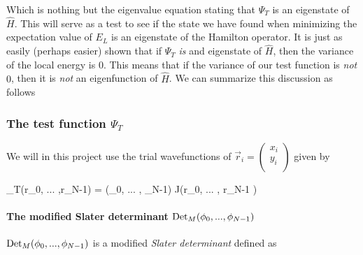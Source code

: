 Which is nothing but the eigenvalue equation stating that $\Psi_T$ is an eigenstate of $\hat{H}$.
This will serve as a test to see if the state we have found when minimizing the expectation value of $E_L$ is an eigenstate of the Hamilton operator. 
It is just as easily (perhaps easier) shown that if $\Psi_T$ \textit{is} and eigenstate of $\hat{H}$, then the variance of the local energy is $0$. 
This means that if the variance of our test function is \textit{not} $0$, then it is \textit{not} an eigenfunction of $\hat{H}$. 
We can summarize this discussion as follows

\eqs
{}
\eqf











\subsubsection{The test function $\Psi_T$}

We will in this project use the trial wavefunctions of $\vec r_i = \left ( \begin{matrix} x_i \\ y_i \\ \end{matrix}\right )$ given by 

\eqs
\Psi_T(\vec r_0, ... ,\vec r_{N-1})  = \Det(\phi_0,  ... , \phi_{N-1}) \cdot \textrm{J}(\vec r_0, ... , \vec r_{N-1} )
\label{eq:Trial_Wavefunction}
\eqf

\paragraph{The modified Slater determinant $\textrm{Det}_M(\phi_0,  ... , \phi_{N-1})$}

$\textrm{Det}_M(\phi_0,  ... , \phi_{N-1})$ is a modified \textit{Slater determinant} defined as 

